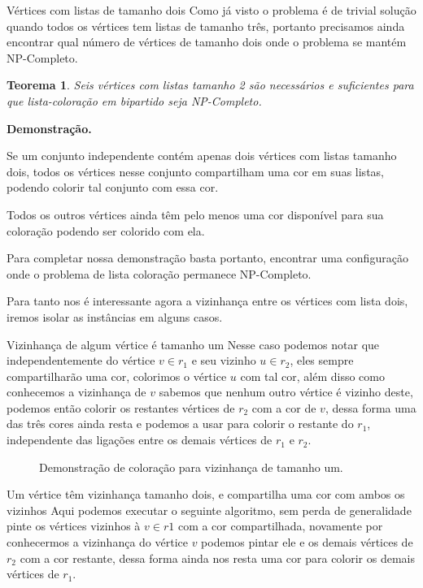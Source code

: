 \documentclass[9pt, compress]{beamer}
\newtheorem{teorema}{Teorema}
\newcommand{\?}{\textcolor{warn}{\textit{?}}}
\begin{document}
     \begin{frame}{Vértices com listas de tamanho dois}
       Como já visto o problema é de trivial solução quando todos os vértices tem listas de tamanho três, portanto precisamos ainda encontrar qual número de vértices de tamanho dois onde o problema se mantém NP-Completo.
       \begin{teorema}
         Seis vértices com listas tamanho 2 são necessários e suficientes para que lista-coloração em bipartido seja NP-Completo.
       \end{teorema}
       \textbf{Demonstração.}
       
 
       Se um conjunto independente contém apenas dois vértices com listas tamanho dois, todos os vértices nesse conjunto compartilham uma cor em suas listas, podendo colorir tal conjunto com essa cor.
       
        Todos os outros vértices ainda têm pelo menos uma cor disponível para sua coloração podendo ser colorido com ela. 
       
       Para completar nossa demonstração basta portanto, encontrar uma configuração onde o problema de lista coloração permanece NP-Completo.
 
       Para tanto nos é interessante agora a vizinhança entre os vértices com lista dois, iremos isolar as instâncias em alguns casos.  
       
     \end{frame}
     \begin{frame}{Vizinhança de algum vértice é tamanho um}
        Nesse caso podemos notar que independentemente do vértice $v \in r_1$ e seu vizinho $u \in r_2$, eles sempre compartilharão uma cor, colorimos o vértice $u$ com tal cor, além disso como conhecemos a vizinhança de $v$ sabemos que nenhum outro vértice é vizinho deste, podemos então colorir os restantes vértices de $r_2$ com a cor de $v$, dessa forma uma das três cores ainda resta e podemos a usar para colorir o restante do $r_1$, independente das ligações entre os demais vértices de $r_1$ e $r_2$.
     \end{frame}
     \begin{frame}
       \begin{figure}[H]
         \centering
         \fontsize{4}{10}
         
         \caption{Demonstração de coloração para vizinhança de tamanho um.}
       \end{figure}
     \end{frame}
     \begin{frame}{Um vértice têm vizinhança tamanho dois, e compartilha uma cor com ambos os vizinhos}
       Aqui podemos executar o seguinte algoritmo, sem perda de generalidade pinte os vértices vizinhos à $v \in r1$ com a cor compartilhada, novamente por conhecermos a vizinhança do vértice $v$ podemos pintar ele e os demais vértices de $r_2$ com a cor restante, dessa forma ainda nos resta uma cor para colorir os demais vértices de $r_1$.
     \end{frame}
\end{document}
